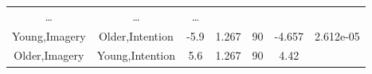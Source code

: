 \documentclass[]{article}
\theoremstyle{definition}
\theoremstyle{definition}
\theoremstyle{definition}
\theoremstyle{remark}
\begin{document}
\begin{longtable}[]{@{}ccccccc@{}}
\begin{minipage}[t]{0.05\columnwidth}
\ldots{}\strut
\end{minipage} & \begin{minipage}[t]{0.11\columnwidth}\centering\strut
\ldots{}\strut
\end{minipage} & \begin{minipage}[t]{0.11\columnwidth}\centering\strut
\ldots{}\strut
\end{minipage}\tabularnewline
\begin{minipage}[t]{0.16\columnwidth}\centering\strut
Young,Imagery\strut
\end{minipage} & \begin{minipage}[t]{0.16\columnwidth}\centering\strut
Older,Intention\strut
\end{minipage} & \begin{minipage}[t]{0.10\columnwidth}\centering\strut
-5.9\strut
\end{minipage} & \begin{minipage}[t]{0.11\columnwidth}\centering\strut
1.267\strut
\end{minipage} & \begin{minipage}[t]{0.05\columnwidth}\centering\strut
90\strut
\end{minipage} & \begin{minipage}[t]{0.11\columnwidth}\centering\strut
-4.657\strut
\end{minipage} & \begin{minipage}[t]{0.11\columnwidth}\centering\strut
2.612e-05\strut
\end{minipage}\tabularnewline
\begin{minipage}[t]{0.16\columnwidth}\centering\strut
Older,Imagery\strut
\end{minipage} & \begin{minipage}[t]{0.16\columnwidth}\centering\strut
Young,Intention\strut
\end{minipage} & \begin{minipage}[t]{0.10\columnwidth}\centering\strut
5.6\strut
\end{minipage} & \begin{minipage}[t]{0.11\columnwidth}\centering\strut
1.267\strut
\end{minipage} & \begin{minipage}[t]{0.05\columnwidth}\centering\strut
90\strut
\end{minipage} & \begin{minipage}[t]{0.11\columnwidth}\centering\strut
4.42\strut
\end{minipage} & \begin{minipage}[t]{0.11\columnwidth}\centering\strut

\end{minipage}
\end{longtable}
\end{document}
